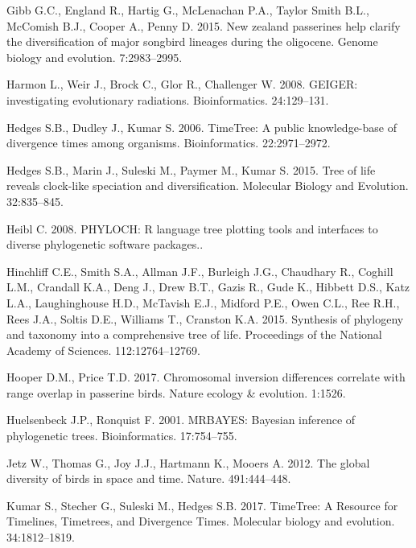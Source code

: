 \documentclass[]{article}
\begin{document}
\leavevmode\hypertarget{ref-gibb2015new}{}%
Gibb G.C., England R., Hartig G., McLenachan P.A., Taylor Smith B.L., McComish B.J., Cooper A., Penny D. 2015. New zealand passerines help clarify the diversification of major songbird lineages during the oligocene. Genome biology and evolution. 7:2983--2995.

\leavevmode\hypertarget{ref-Harmon2008}{}%
Harmon L., Weir J., Brock C., Glor R., Challenger W. 2008. GEIGER: investigating evolutionary radiations. Bioinformatics. 24:129--131.

\leavevmode\hypertarget{ref-Hedges2006}{}%
Hedges S.B., Dudley J., Kumar S. 2006. TimeTree: A public knowledge-base of divergence times among organisms. Bioinformatics. 22:2971--2972.

\leavevmode\hypertarget{ref-Hedges2015}{}%
Hedges S.B., Marin J., Suleski M., Paymer M., Kumar S. 2015. Tree of life reveals clock-like speciation and diversification. Molecular Biology and Evolution. 32:835--845.

\leavevmode\hypertarget{ref-Heibl2008}{}%
Heibl C. 2008. PHYLOCH: R language tree plotting tools and interfaces to diverse phylogenetic software packages..

\leavevmode\hypertarget{ref-Hinchliff2015}{}%
Hinchliff C.E., Smith S.A., Allman J.F., Burleigh J.G., Chaudhary R., Coghill L.M., Crandall K.A., Deng J., Drew B.T., Gazis R., Gude K., Hibbett D.S., Katz L.A., Laughinghouse H.D., McTavish E.J., Midford P.E., Owen C.L., Ree R.H., Rees J.A., Soltis D.E., Williams T., Cranston K.A. 2015. Synthesis of phylogeny and taxonomy into a comprehensive tree of life. Proceedings of the National Academy of Sciences. 112:12764--12769.

\leavevmode\hypertarget{ref-hooper2017chromosomal}{}%
Hooper D.M., Price T.D. 2017. Chromosomal inversion differences correlate with range overlap in passerine birds. Nature ecology \& evolution. 1:1526.

\leavevmode\hypertarget{ref-Huelsenbeck2001}{}%
Huelsenbeck J.P., Ronquist F. 2001. MRBAYES: Bayesian inference of phylogenetic trees. Bioinformatics. 17:754--755.

\leavevmode\hypertarget{ref-Jetz2012}{}%
Jetz W., Thomas G., Joy J.J., Hartmann K., Mooers A. 2012. The global diversity of birds in space and time. Nature. 491:444--448.

\leavevmode\hypertarget{ref-Kumar2017}{}%
Kumar S., Stecher G., Suleski M., Hedges S.B. 2017. TimeTree: A Resource for Timelines, Timetrees, and Divergence Times. Molecular biology and evolution. 34:1812--1819.
\end{document}
